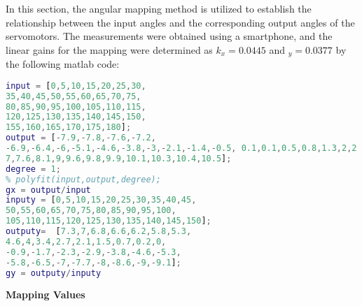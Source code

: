 
In this section, the angular mapping method is utilized to establish the relationship between the input angles and the corresponding output angles of the servomotors. The measurements were obtained using a smartphone, and the linear gains for the mapping were determined as \(k_x = 0.0445\) and \(_y = 0.0377\) by the following matlab code:
\begin{lstlisting}[language=Matlab , caption= matlab code for polynomial fits ]
input = [0,5,10,15,20,25,30,
35,40,45,50,55,60,65,70,75,
80,85,90,95,100,105,110,115,
120,125,130,135,140,145,150,
155,160,165,170,175,180];
output = [-7.9,-7.8,-7.6,-7.2,
-6.9,-6.4,-6,-5.1,-4.6,-3.8,-3,-2.1,-1.4,-0.5, 0.1,0.1,0.5,0.8,1.3,2,2.8,3.6,4.4,5,5.7,6.4,
7,7.6,8.1,9,9.6,9.8,9.9,10.1,10.3,10.4,10.5];
degree = 1;
% polyfit(input,output,degree);
gx = output/input
inputy = [0,5,10,15,20,25,30,35,40,45,
50,55,60,65,70,75,80,85,90,95,100,
105,110,115,120,125,130,135,140,145,150];
outputy=  [7.3,7,6.8,6.6,6.2,5.8,5.3,
4.6,4,3.4,2.7,2.1,1.5,0.7,0.2,0,
-0.9,-1.7,-2.3,-2.9,-3.8,-4.6,-5.3,
-5.8,-6.5,-7,-7.7,-8,-8.6,-9,-9.1];
gy = outputy/inputy
\end{lstlisting}

{\large \textbf{Mapping Values}}

